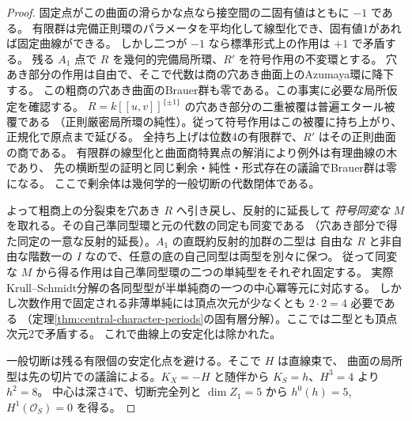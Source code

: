 \begin{proof}
固定点がこの曲面の滑らかな点なら接空間の二固有値はともに $-1$ である。
有限群は完備正則環のパラメータを平均化して線型化でき、固有値1があれば固定曲線ができる。
しかし二つが $-1$ なら標準形式上の作用は $+1$ で矛盾する。
残る $A_1$ 点で $R$ を幾何的完備局所環、$R'$ を符号作用の不変環とする。
穴あき部分の作用は自由で、そこで代数は商の穴あき曲面上のAzumaya環に降下する。
この粗商の穴あき曲面のBrauer群も零である。この事実に必要な局所仮定を確認する。
$R=k[[u,v]]^{\{\pm1\}}$ の穴あき部分の二重被覆は普遍エタール被覆である
（正則厳密局所環の純性）。従って符号作用はこの被覆に持ち上がり、正規化で原点まで延びる。
全持ち上げは位数4の有限群で、$R'$ はその正則曲面の商である。
有限群の線型化と曲面商特異点の解消により例外は有理曲線の木であり、
先の横断型の証明と同じ剰余・純性・形式存在の議論でBrauer群は零になる。
ここで剰余体は幾何学的一般切断の代数閉体である。

よって粗商上の分裂束を穴あき $R$ へ引き戻し、反射的に延長して
\emph{符号同変な} $M$ を取れる。その自己準同型環と元の代数の同定も同変である
（穴あき部分で得た同定の一意な反射的延長）。$A_1$ の直既約反射的加群の二型は
自由な $R$ と非自由な階数一の $I$ なので、任意の底の自己同型は両型を別々に保つ。
従って同変な $M$ から得る作用は自己準同型環の二つの単純型をそれぞれ固定する。
実際Krull--Schmidt分解の各同型型が半単純商の一つの中心冪等元に対応する。
しかし次数作用で固定される非薄単純には頂点次元が少なくとも $2\cdot2=4$ 必要である
（定理\ref{thm:central-character-periods}の固有層分解）。ここでは二型とも頂点次元2で矛盾する。
これで曲線上の安定化は除かれた。

一般切断は残る有限個の安定化点を避ける。そこで $H$ は直線束で、
曲面の局所型は先の切片での議論による。$K_X=-H$ と随伴から $K_S=h$、$H^3=4$ より $h^2=8$。
中心は深さ4で、切断完全列と $\dim Z_1=5$ から $h^0(h)=5$, $H^1(\mathcal O_S)=0$ を得る。
\end{proof}

